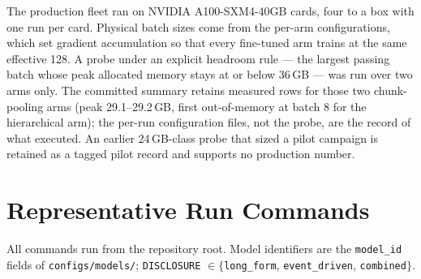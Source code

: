 The production fleet ran on NVIDIA A100-SXM4-40GB cards, four to a box with one
run per card. Physical batch sizes come from the per-arm configurations, which
set gradient accumulation so that every fine-tuned arm trains at the same
effective 128. A probe under an explicit headroom rule --- the largest passing
batch whose peak allocated memory stays at or below 36\,GB --- was run over two
arms only. The committed summary retains measured rows for those two
chunk-pooling arms (peak 29.1--29.2\,GB, first out-of-memory at batch 8 for
the hierarchical arm); the per-run configuration files, not the probe, are the
record of what executed. %
An earlier 24\,GB-class probe that sized a pilot campaign is retained as a tagged
pilot record and supports no production number. %

\FloatBarrier
\section{Representative Run Commands}
\label{app:hyperparams:commands}

\begin{sloppypar}
All commands run from the repository root. Model identifiers are the
\texttt{model\_id} fields of \texttt{configs/models/}; \texttt{DISCLOSURE}
$\in \{$\texttt{long\_form}, \texttt{event\_driven}, \texttt{combined}$\}$.
\end{sloppypar}

